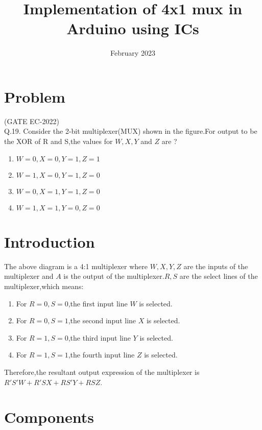 \documentclass[12pt]{article}
\title{Implementation of 4x1 mux in Arduino using ICs}
\date{February 2023}
\begin{document}
\maketitle
\tableofcontents

	 \section{Problem}
	 (GATE EC-2022)\\

Q.19. Consider the 2-bit multiplexer(MUX) shown in the figure.For output to be the XOR of R and S,the values for $ W,X,Y$ and $Z$ are ?\newline

\begin{enumerate}
\item $W = 0, X = 0, Y = 1, Z = 1$
\item $W = 1, X = 0, Y = 1, Z = 0$
\item $W = 0, X = 1, Y = 1, Z = 0$
\item $W = 1, X = 1, Y = 0, Z = 0$
\end{enumerate}
\section{Introduction}
	The above diagram is a 4:1 multiplexer where $W, X, Y, Z$ are the inputs of the multiplexer and $A$ is the output of the multiplexer.$R , S$ are the select lines of the multiplexer,which means:\newline
\begin{enumerate}
\item For $R = 0,S = 0$,the first input line $W$ is selected.
\item For $R = 0,S = 1$,the second input line $X$ is selected.
\item For $R = 1,S = 0$,the third input line $Y$ is selected.
\item For $R = 1,S = 1$,the fourth input line $Z$ is selected.
\end{enumerate}
Therefore,the resultant output expression of the multiplexer is $R'S'W + R'SX + RS'Y + RSZ$.
\section{Components}
	
	\pagebreak
\end{document}
